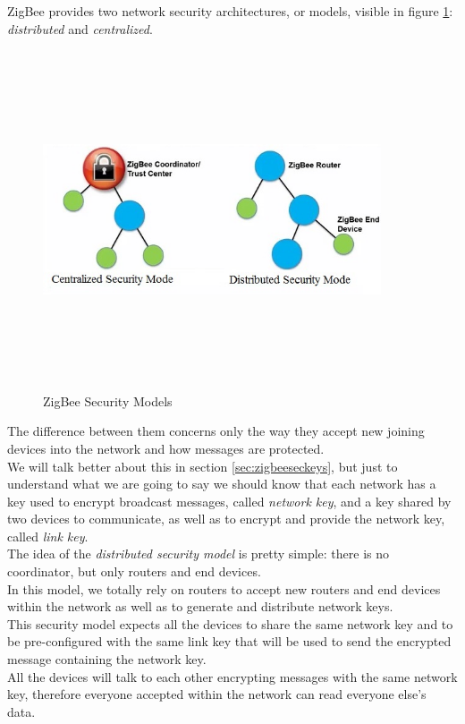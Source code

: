 \documentclass[12pt]{report}
\begin{document}
{{ZigBee provides two network security architectures, or models, visible in figure \ref{fig:zigbeemodels}: \emph{distributed} and \emph{centralized}.\\

\begin{figure}[H]
\includegraphics[width=10cm,height=10cm,keepaspectratio]{security_models}
\centering
\caption{ZigBee Security Models}
\label{fig:zigbeemodels}
\end{figure}

The difference between them concerns only the way they accept new joining devices into the network and how messages are protected.\\

We will talk better about this in section \ref{sec:zigbeeseckeys}, but just to understand what we are going to say we should know that each network has a key used to encrypt broadcast messages, called \emph{network key}, and a key shared by two devices to communicate, as well as to encrypt and provide the network key, called \emph{link key}.\\

The idea of the \emph{distributed security model} is pretty simple: there is no coordinator, but only routers and end devices.\\
In this model, we totally rely on routers to accept new routers and end devices within the network as well as to generate and distribute network keys.\\

This security model expects all the devices to share the same network key and to be pre-configured with the same link key that will be used to send the encrypted message containing the network key.\\
All the devices will talk to each other encrypting messages with the same network key, therefore everyone accepted within the network can read everyone else's data.\\

}}
\end{document}
